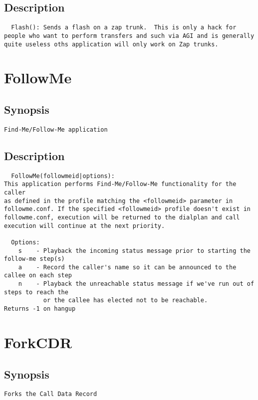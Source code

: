 \subsection{Description}
\begin{verbatim}
  Flash(): Sends a flash on a zap trunk.  This is only a hack for
people who want to perform transfers and such via AGI and is generally
quite useless oths application will only work on Zap trunks.

\end{verbatim}


\section{FollowMe}
\subsection{Synopsis}
\begin{verbatim}
Find-Me/Follow-Me application
\end{verbatim}
\subsection{Description}
\begin{verbatim}
  FollowMe(followmeid|options):
This application performs Find-Me/Follow-Me functionality for the caller
as defined in the profile matching the <followmeid> parameter in
followme.conf. If the specified <followmeid> profile doesn't exist in
followme.conf, execution will be returned to the dialplan and call
execution will continue at the next priority.

  Options:
    s    - Playback the incoming status message prior to starting the follow-me step(s)
    a    - Record the caller's name so it can be announced to the callee on each step
    n    - Playback the unreachable status message if we've run out of steps to reach the
           or the callee has elected not to be reachable.
Returns -1 on hangup

\end{verbatim}


\section{ForkCDR}
\subsection{Synopsis}
\begin{verbatim}
Forks the Call Data Record
\end{verbatim}

